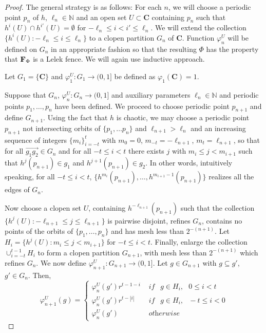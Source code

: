 \documentclass[11pt]{amsart}
\newcommand{\N}{\mathbb{N}}  %
\newcommand{\oa}{\overrightarrow}
\newcommand{\cantor}{\mathbf C}
\newcommand{\fence}{{\bf F}_{\Phi}{}}
\begin{document}
{\begin{proof}
         The general strategy is as follows: For each $n$, we will choose a periodic point $p_n$ of $h$, $\ell_n \in \N$ and an open set $U\subset \cantor$ containing $p_n$ such that $h^i(U) \cap h^{i'}(U) = \emptyset$ for $ -\ell_n  \le i< i' \le \ell_n$. We will extend the collection $\{h^i(U): -\ell_n \le i \le \ell_n\}$ to a clopen partition $G_n$ of $ \cantor$. Function $\varphi^U_n$ will be defined on $G_n$ in an appropriate fashion so that the resulting $\Phi$ has the property that $\fence$ is a Lelek fence. We will again use inductive approach.
         
 Let $G_1= \{\cantor\}$ and $\varphi^U_1:G_1 \rightarrow (0,1]$ be defined as $\varphi_1(\cantor) =1$.
 
          Suppose that $G_n$, $\varphi^U_n: G_n \rightarrow (0,1]$ and auxiliary parameters $\ell_n \in \N$ and periodic points $p_1,\ldots, p_n$ have been defined. We proceed to choose periodic point $p_{n+1}$ and define $G_{n+1}$. Using the fact that $h$ is chaotic, we may choose a periodic point $p_{n+1}$ not intersecting orbits of $\{p_1, \ldots p_n\}$ and $ \ell_{n+1} > \ell_n$ and an increasing sequence of integers $\{m_i\}_{i=-t}^t$ with $m_0 =0$,   $m_{-t} = -\ell_{n+1}$, $m_t = \ell_{n+1}$,  so that for all    $\oa{g_1g_2} \in G_n$ and for all $-t \le i < t$  there exists $j$ with $m_i \le j < m_{i+1}$ such that $h^j(p_{n+1}) \in g_1$ and $h^{j+1}(p_{n+1}) \in g_2$. In other words, intuitively speaking, for all $-t\leq i< t$, $\{h^{m_i}(p_{n+1}), \ldots, h^{m_{i+1}-1}(p_{n+1})\}$ realizes all the edges of $G_n$. 

    Now choose  a clopen set $U$, containing $h^{-\ell_{n+1}}(p_{n+1})$ such that the collection $\{h^j(U):-\ell_{n+1} \le j \le \ell_{n+1}\}$ is pairwise disjoint, refines $G_n$, contains no points of the orbits of $\{p_1, \ldots, p_n\}$ and has mesh less than $2^{-(n+1)}$.   Let $H_i =\{h^j(U): m_i \le j <m_{i+1} \}$ for $-t \leq i<t$. Finally, enlarge the collection $\cup_{i=-t}^{t-1}H_i$ to form a clopen partition $G_{n+1}$, with mesh less than $2^{-(n+1)}$ which refines $G_n$. 
    We now define $\varphi^U_{n+1}: G_{n+1} \rightarrow (0,1]$. Let $g \in G_{n+1}$ with $g \subseteq g'$, $g' \in G_n$. Then,
    \[ \varphi^U_{n+1}(g) = \begin{cases} 
          \varphi^U_n(g') r^{t-1-i }&  \textit { if }  \ \ g \in H_{i},\ \ \ 
           0 \le i < t  \ \ \ \\
           \varphi^U_n(g') r^{t-|i| }&  \textit { if }  \ \ g \in H_{i},  \ \ \ 
           -t \le i < 0 \\
          \varphi^U_n(g')  & \textit{ otherwise }
       \end{cases}
    \]


\end{proof}}
\end{document}
